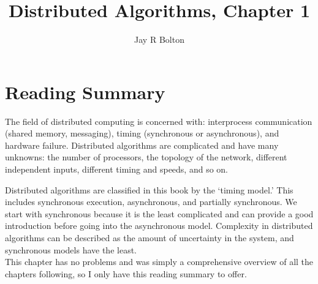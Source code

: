 \documentclass{article}
\title{Distributed Algorithms, Chapter 1}
\author{Jay R Bolton}
\begin{document}
\maketitle

\section*{Reading Summary}

The field of distributed computing is concerned with: interprocess
communication (shared memory, messaging), timing (synchronous or asynchronous),
and hardware failure. Distributed algorithms are complicated and have many
unknowns: the number of processors, the topology of the network, different
independent inputs, different timing and speeds, and so on.

Distributed algorithms are classified in this book by the `timing model.' This
includes synchronous execution, asynchronous, and partially synchronous. We
start with synchronous because it is the least complicated and can provide a
good introduction before going into the asynchronous model. Complexity in
distributed algorithms can be described as the amount of uncertainty in the
system, and synchronous models have the least.
\\[2em]
This chapter has no problems and was simply a comprehensive overview of all the
chapters following, so I only have this reading summary to offer.
\end{document}
